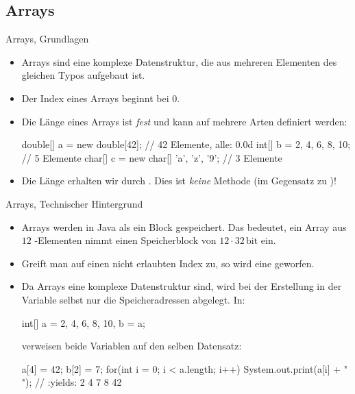\subsection{Arrays}
\begin{frame}[fragile]{Arrays, Grundlagen}
    \begin{itemize}[<+(1)->]
        \widei
        \item Arrays sind eine komplexe Datenstruktur,\pause{} die aus mehreren Elementen des gleichen Typos aufgebaut ist.
        \item Der Index eines Arrays beginnt bei \(0\).
        \item Die Länge eines Arrays ist \emph{fest}\pause{} und kann auf mehrere Arten definiert werden:\pause{}
\begin{plainjava}
double[] a = new double[42]; // 42 Elemente, alle: 0.0d
int[] b = {2, 4, 6, 8, 10}; // 5 Elemente
char[] c = new char[] {'a', 'z', '9'}; // 3 Elemente
\end{plainjava}
        \item Die Länge erhalten wir durch .\pause{} Dies ist \emph{keine} Methode (im Gegensatz zu )!
    \end{itemize}
\end{frame}

\begin{frame}[fragile]{Arrays, Technischer Hintergrund}
    \begin{itemize}[<+(1)->]
        \widei
        \item Arrays werden in Java als ein Block gespeichert.\pause{} Das bedeutet, ein Array aus \(12\) -Elementen nimmt einen Speicherblock von \(12 \cdot 32\,\text{bit}\) ein.
        \item Greift man auf einen nicht erlaubten Index zu,\pause{} so wird eine  geworfen.
        \item Da Arrays eine komplexe Datenstruktur sind, wird bei der Erstellung in der Variable selbst nur die Speicheradressen abgelegt.\pause{} In:\pause{}
\begin{plainjava}
int[] a = {2, 4, 6, 8, 10}, b = a;
\end{plainjava}
        \pause{}verweisen beide Variablen auf den selben Datensatz:\pause{}
\begin{plainjava}
a[4] = 42; b[2] = 7;
for(int i = 0; i < a.length; i++)
    System.out.print(a[i] + " "); // :yields: 2 4 7 8 42
\end{plainjava}
    \end{itemize}
\end{frame}

